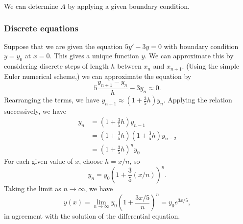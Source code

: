 \documentclass[a4paper]{article}
\begin{document}
We can determine $A$ by applying a given boundary condition.

\subsubsection*{Discrete equations}
Suppose that we are given the equation $5y' - 3y = 0$ with boundary condition $y = y_0$ at $x = 0$. This gives a unique function $y$. We can approximate this by considering discrete steps of length $h$ between $x_n$ and $x_{n+1}$. (Using the simple Euler numerical scheme,) we can approximate the equation by
\[
  5\frac{y_{n+1} - y_n}{h} - 3y_n \approx 0.
\]
Rearranging the terms, we have $y_{n+1} \approx (1 + \frac{3}{5}h)y_n$. Applying the relation successively, we have
\begin{align*}
  y_n &= \left(1 + \frac{3}{5}h\right)y_{n - 1}\\
  &= \left(1 + \frac{3}{5}h\right)\left(1 + \frac{3}{5}h\right)y_{n - 2}\\
  &= \left(1 + \frac{3}{5}h\right)^ny_0
\end{align*}
For each given value of $x$, choose $h = x/n$, so
\[
  y_n = y_0\left(1 + \frac{3}{5}(x/n)\right)^n.
\]
Taking the limit as $n\to \infty$, we have
\[
  y(x) = \lim_{n\to \infty} y_0\left(1 + \frac{3x/5}{n}\right)^n = y_0 e^{3x/5},
\]
in agreement with the solution of the differential equation.
\begin{center}
\end{center}
\end{document}
